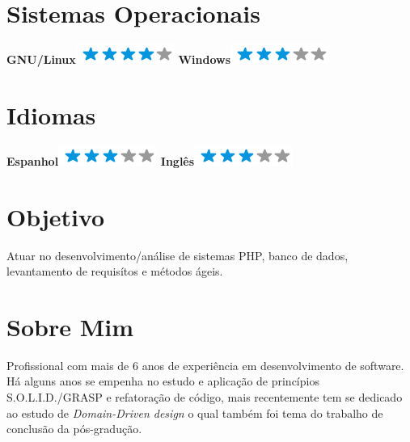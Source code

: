 \documentclass[]{friggeri-cv}
\begin{document}
\begin{aside}
  \section{Sistemas Operacionais}
    \textbf{GNU/Linux}\includegraphics[scale=0.40]{img/4stars.png}
    \textbf{Windows}\includegraphics[scale=0.40]{img/3stars.png}
    ~
  \section{Idiomas}
    \textbf{Espanhol}\includegraphics[scale=0.40]{img/3stars.png}
    \textbf{Inglês}\includegraphics[scale=0.40]{img/3stars.png}
\end{aside}

\section{Objetivo}
Atuar no desenvolvimento/análise de sistemas PHP, banco de dados, levantamento de requisítos e métodos ágeis.

\section{Sobre Mim}
Profissional com mais de 6 anos de experiência em desenvolvimento de software. Há alguns anos se empenha no estudo e aplicação de princípios S.O.L.I.D./GRASP e refatoração de código, mais recentemente tem se dedicado ao estudo de \textit{Domain-Driven design} o qual também foi tema do trabalho de conclusão da pós-gradução.
\end{document}
